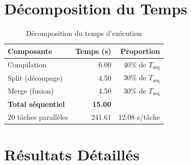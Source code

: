 \documentclass[11pt,a4paper]{article}
\begin{document}
\section{Décomposition du Temps}

\begin{table}[h]
\centering
\caption{Décomposition du temps d'exécution}
\begin{tabular}{lrr}
\toprule
\textbf{Composante} & \textbf{Temps (s)} & \textbf{Proportion} \\
\midrule
Compilation & 6.00 & 40\% de $T_{\text{seq}}$ \\
Split (découpage) & 4.50 & 30\% de $T_{\text{seq}}$ \\
Merge (fusion) & 4.50 & 30\% de $T_{\text{seq}}$ \\
\midrule
\textbf{Total séquentiel} & \textbf{15.00} & \\
\midrule
20 tâches parallèles & 241.61 & 12.08 s/tâche \\
\bottomrule
\end{tabular}
\end{table}

\section{Résultats Détaillés}
\end{document}
